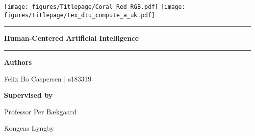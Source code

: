 \begin{titlepage}
    \raggedright
    \texttt{[image: figures/Titlepage/Coral\_Red\_RGB.pdf]}
    \hfill
    \texttt{[image: figures/Titlepage/tex\_dtu\_compute\_a\_uk.pdf]}
    \begin{center}
        \vspace{3 cm}
        \hrule
        \vspace{.3cm}
        { \huge {\bfseries {\opgavetitel}}
        } 
        
        \vspace{.1cm}
        { \LARGE {\bfseries 
            {
                Human-Centered Artificial Intelligence
            }
        }
        }
        \vspace{.5cm}
        
        \hrule
        \vspace{1.5cm}
        
        \textbf{Authors}\\
        \vspace{.5cm}
        \centering
        
        Felix Bo Caspersen | s183319\\
        
        \vspace{1.5cm}
        
        \textbf{Supervised by}\\
        \vspace{.5cm}
        \centering

        Professor Per B\ae kgaard \\
        \vspace{1.5cm}
        
        Kongens Lyngby \\
        \centering \datoen %
    \end{center}
\end{titlepage}